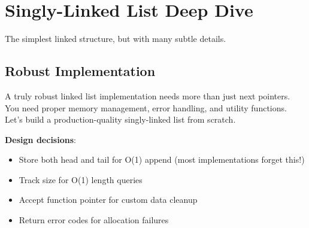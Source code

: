 \section{Singly-Linked List Deep Dive}

The simplest linked structure, but with many subtle details.

\subsection{Robust Implementation}

A truly robust linked list implementation needs more than just next pointers. You need proper memory management, error handling, and utility functions. Let's build a production-quality singly-linked list from scratch.

\textbf{Design decisions}:
\begin{itemize}
    \item Store both head and tail for O(1) append (most implementations forget this!)
    \item Track size for O(1) length queries
    \item Accept function pointer for custom data cleanup
    \item Return error codes for allocation failures
\end{itemize}

